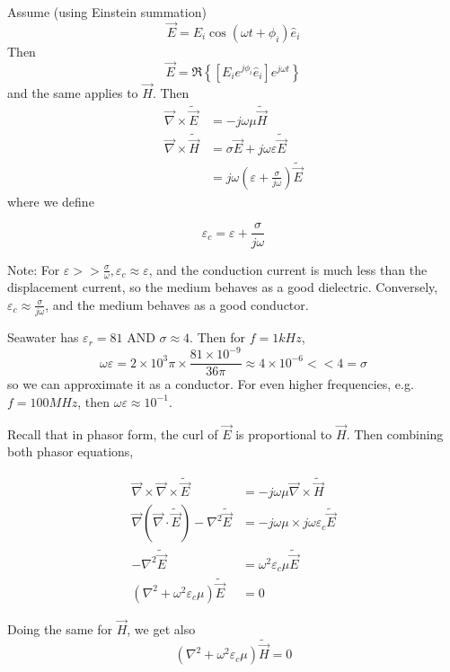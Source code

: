 \documentclass[12pt]{article}
\begin{document}
Assume (using Einstein summation)
$$\vec E = E_i \cos(\omega t + \phi_i) \hat e_i$$
Then
$$\vec E = \Re\left\{\left[E_ie^{j\phi_i}\hat e_i\right]e^{j\omega t}\right\}$$
and the same applies to $\vec H$. Then
\begin{align*}
    \vec\nabla \times \tilde{\vec E} &= -j\omega\mu\tilde{\vec H} \\
    \vec\nabla \times \tilde{\vec H} &= \sigma\vec E + j\omega\varepsilon\tilde{\vec E} \\
                                     &= j\omega\left(\varepsilon + \frac{\sigma}{j\omega}\right)\tilde{\vec E}
\end{align*}
where we define

\begin{defn}
    $$\varepsilon_c = \varepsilon + \frac{\sigma}{j\omega}$$
\end{defn}

Note: For $\varepsilon >> \frac{\sigma}{\omega}, \varepsilon_c \approx \varepsilon$, and the conduction current is much less than the displacement current, so the medium behaves as a good dielectric. Conversely, $\varepsilon_c \approx \frac{\sigma}{j\omega}$, and the medium behaves as a good conductor.

\begin{ex}
    Seawater has $\varepsilon_r = 81$ AND $\sigma \approx 4$. Then for $f = 1\unit{kHz}$,
    $$\omega\varepsilon = 2 \times 10^3\pi \times \frac{81\times10^{-9}}{36\pi} \approx 4 \times 10^{-6} << 4 = \sigma$$
    so we can approximate it as a conductor. For even higher frequencies, e.g. $f = 100\unit{MHz}$, then $\omega\varepsilon \approx 10^{-1}$.
\end{ex}

Recall that in phasor form, the curl of $\vec E$ is proportional to $\vec H$. Then combining both phasor equations,

\begin{align*}
    \vec\nabla \times \vec\nabla \times \tilde{\vec E} &= -j\omega\mu \vec\nabla \times \tilde{\vec H} \\
    \vec\nabla(\vec\nabla \cdot \tilde{\vec E}) - \nabla^2\tilde{\vec E} &= -j\omega\mu \times j\omega\varepsilon_c \tilde{\vec E} \\
    -\nabla^2\tilde{\vec E} &= \omega^2\varepsilon_c\mu\tilde{\vec E} \\
    (\nabla^2 + \omega^2\varepsilon_c\mu)\tilde{\vec E} &= 0
\end{align*}

Doing the same for $\vec H$, we get also
$$(\nabla^2 + \omega^2\varepsilon_c\mu)\tilde{\vec H} = 0$$
\end{document}
